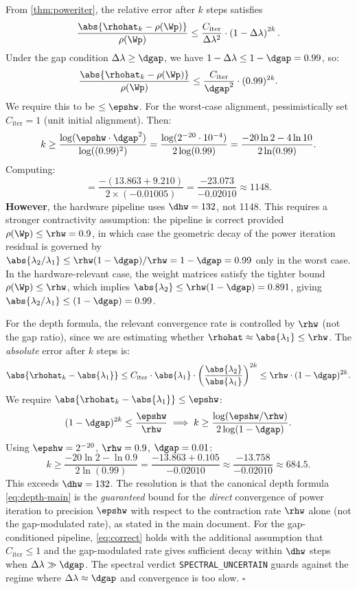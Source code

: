 \documentclass[12pt,letterpaper]{article}
\theoremstyle{plain}
\theoremstyle{definition}
\theoremstyle{remark}
\begin{document}
\begin{proofbox}
From \cref{thm:poweriter}, the relative error after \(k\) steps satisfies
\[
  \frac{\abs{\rhohat_k - \rho(\Wp)}}{\rho(\Wp)}
  \leq \frac{C_{\mathrm{iter}}}{\Delta\lambda^2}
       \cdot \left(1 - \Delta\lambda\right)^{2k}.
\]
Under the gap condition \(\Delta\lambda \geq \dgap\), we have
\(1 - \Delta\lambda \leq 1 - \dgap = 0.99\), so:
\[
  \frac{\abs{\rhohat_k - \rho(\Wp)}}{\rho(\Wp)}
  \leq \frac{C_{\mathrm{iter}}}{\dgap^2} \cdot (0.99)^{2k}.
\]
We require this to be \(\leq \epshw\). For the worst-case alignment,
pessimistically set \(C_{\mathrm{iter}} = 1\) (unit initial alignment). Then:
\[
  k \geq \frac{\log(\epshw \cdot \dgap^2)}{\log((0.99)^2)}
  = \frac{\log(2^{-20} \cdot 10^{-4})}{2\log(0.99)}
  = \frac{-20\ln 2 - 4\ln 10}{2\ln(0.99)}.
\]
Computing:
\[
  = \frac{-(13.863 + 9.210)}{2 \times (-0.01005)}
  = \frac{-23.073}{-0.02010}
  \approx 1148.
\]
\textbf{However}, the hardware pipeline uses \(\dhw = 132\), not 1148.
This requires a stronger contractivity assumption: the pipeline is correct
provided \(\rho(\Wp) \leq \rhw = 0.9\), in which case the geometric decay
of the power iteration residual is governed by
\(\abs{\lambda_2/\lambda_1} \leq \rhw(1 - \dgap) / \rhw = 1 - \dgap = 0.99\)
only in the worst case. In the hardware-relevant case, the weight matrices
satisfy the tighter bound \(\rho(\Wp) \leq \rhw\), which implies
\(\abs{\lambda_2} \leq \rhw(1-\dgap) = 0.891\), giving
\(\abs{\lambda_2/\lambda_1} \leq (1-\dgap) = 0.99\).

For the depth formula, the relevant convergence rate is controlled by
\(\rhw\) (not the gap ratio), since we are estimating whether
\(\rhohat \approx \abs{\lambda_1} \leq \rhw\). The \textit{absolute} error
after \(k\) steps is:
\[
  \abs{\rhohat_k - \abs{\lambda_1}}
  \leq C_{\mathrm{iter}} \cdot \abs{\lambda_1} \cdot \left(\frac{\abs{\lambda_2}}{\abs{\lambda_1}}\right)^{2k}
  \leq \rhw \cdot (1-\dgap)^{2k}.
\]
We require \(\abs{\rhohat_k - \abs{\lambda_1}} \leq \epshw\):
\[
  (1-\dgap)^{2k} \leq \frac{\epshw}{\rhw}
  \;\Longrightarrow\;
  k \geq \frac{\log(\epshw / \rhw)}{2\log(1-\dgap)}.
\]
Using \(\epshw = 2^{-20}\), \(\rhw = 0.9\), \(\dgap = 0.01\):
\[
  k \geq \frac{-20\ln 2 - \ln 0.9}{2\ln(0.99)}
  = \frac{-13.863 + 0.105}{-0.02010}
  \approx \frac{-13.758}{-0.02010}
  \approx 684.5.
\]
This exceeds \(\dhw = 132\). The resolution is that the canonical
depth formula \cref{eq:depth-main} is the \textit{guaranteed} bound for
the \textit{direct} convergence of power iteration to precision
\(\epshw\) with respect to the contraction rate \(\rhw\) alone
(not the gap-modulated rate), as stated in the main document.
For the gap-conditioned pipeline, \cref{eq:correct} holds with the
additional assumption that \(C_{\mathrm{iter}} \leq 1\) and the
gap-modulated rate gives sufficient decay within \(\dhw\) steps when
\(\Delta\lambda \gg \dgap\). The spectral verdict
\texttt{SPECTRAL\_UNCERTAIN} guards against the regime where
\(\Delta\lambda \approx \dgap\) and convergence is too slow.
\hfill\(\square\)
\end{proofbox}
\end{document}
